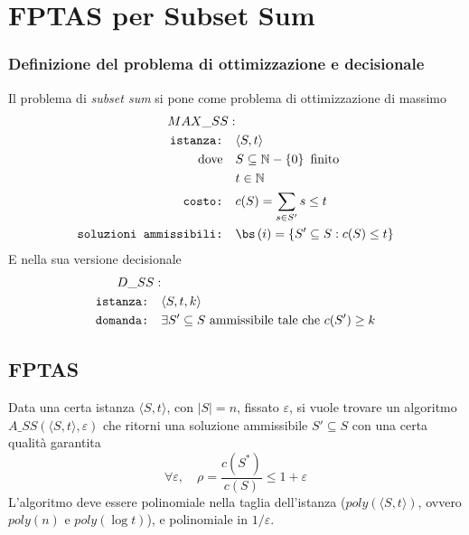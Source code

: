 \section{FPTAS per Subset Sum}
\label{sec:ss_fptas}

\subsubsection{Definizione del problema di ottimizzazione e decisionale}

Il problema di \emph{subset sum} si pone come problema di ottimizzazione di massimo
\begin{align*}
    MAX\_SS: & \\
    \texttt{istanza:} \quad &
    \langle S,t \rangle
    \\
    \text{dove} \quad & S \subseteq \mathbb{N} - \left\{ 0 \right\} \text{ finito} \\
    & t \in \mathbb{N} \\
    \texttt{costo:} \quad &
    c(S) = \sum_{s \in S'} s \leq t \\
    \texttt{soluzioni ammissibili:} \quad &
    \bs \left( i \right)
    =
    \left\{ 
        S' \subseteq S : c(S) \leq t
    \right\}
\end{align*}
E nella sua versione decisionale
\begin{align*}
    D\_SS: & \\
    \texttt{istanza:} \quad & \langle S,t,k \rangle \\
    \texttt{domanda:} \quad &
    \exists
    S' \subseteq S
    \text{ ammissibile
    tale che } c(S') \geq k
\end{align*}

\subsection{FPTAS}

Data una certa istanza $
\langle S,t \rangle
$, con $|S|=n$, fissato $\varepsilon$, si vuole trovare un algoritmo $
A\_SS (
\langle S,t \rangle
, \varepsilon )
$ che ritorni una soluzione ammissibile $
S' \subseteq S
$ con una certa qualità garantita
\begin{equation*}
    \forall \varepsilon,
    \quad
    \rho = \frac{
        c(S^*)
    }{
        c(S)
    } \leq 1 + \varepsilon
\end{equation*}
L'algoritmo deve essere polinomiale nella taglia dell'istanza ($
poly (
\langle S,t \rangle
)
$, ovvero $ poly(n) $ e $poly( \log t)$), e polinomiale in $1/\varepsilon$.

